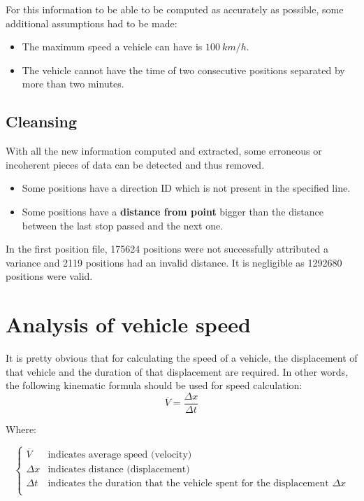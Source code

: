 \documentclass{article}
\begin{document}
For this information to be able to be computed as accurately as possible, some additional assumptions had to be made:

\begin{itemize}
    \item The maximum speed a vehicle can have is $100\ km/h$.
    \item The vehicle cannot have the time of two consecutive positions separated by more than two minutes.
\end{itemize}


\subsection{Cleansing}
With all the new information computed and extracted, some erroneous or incoherent pieces of data can be detected and thus removed.

\begin{itemize}
    \item Some positions have a direction ID which is not present in the specified line.
    \item Some positions have a \textbf{distance from point} bigger than the distance between the last stop passed and the next one.
\end{itemize}

In the first position file, 175624 positions were not successfully attributed a variance and 2119 positions had an invalid distance. It is negligible as 1292680 positions were valid.


\section{Analysis of vehicle speed}

It is pretty obvious that for calculating the speed of a vehicle, the displacement of that vehicle and the duration of that displacement are required. In other words, the following kinematic formula should be used for speed calculation:
$$
\overline{V} = \frac{\Delta x}{\Delta t} 
$$

Where:

$$
    \left \{
        \begin{array}{ll}
            \overline{V} & \mbox{indicates average speed (velocity)} \\ 
            \Delta x & \mbox{indicates distance (displacement)} \\
            \Delta t & \mbox{indicates the duration that the vehicle spent for the displacement $\Delta x$} \\
        \end{array}
    \right 
.$$
\end{document}
